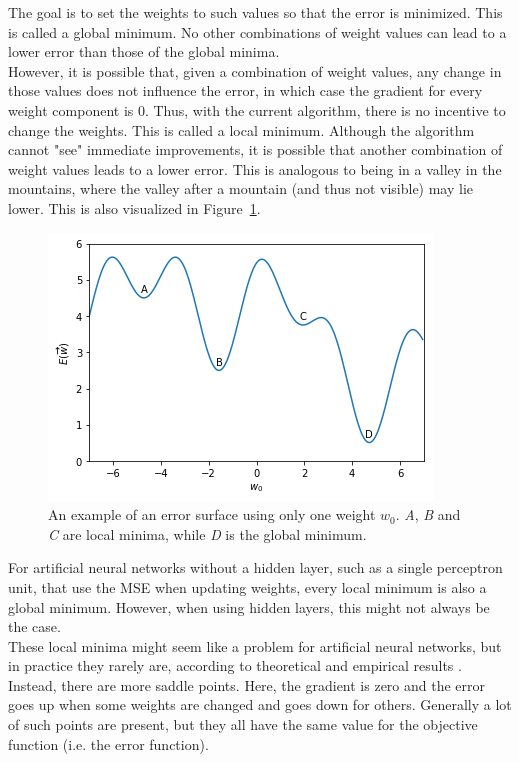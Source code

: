 The goal is to set the weights to such values so that the error is minimized. This is called a global minimum. No other combinations of weight values can lead to a lower error than those of the global minima.\\
However, it is possible that, given a combination of weight values, any change in those values does not influence the error, in which case the gradient for every weight component is $0$. Thus, with the current algorithm, there is no incentive to change the weights. This is called a local minimum. Although the algorithm cannot "see" immediate improvements, it is possible that another combination of weight values leads to a lower error. This is analogous to being in a valley in the mountains, where the valley after a mountain (and thus not visible) may lie lower. This is also visualized in Figure~\ref{fig:error_surface}.\\
\begin{figure}[htb]
    \centering
    \includegraphics[width=.8\linewidth]{images/error_surface.png}
    \caption[An example of an error surface]{An example of an error surface using only one weight $w_0$. \textit{A}, \textit{B} and \textit{C} are local minima, while \textit{D} is the global minimum.}
    \label{fig:error_surface}
\end{figure}

For artificial neural networks without a hidden layer, such as a single perceptron unit, that use the MSE when updating weights, every local minimum is also a global minimum. However, when using hidden layers, this might not always be the case.\\
These local minima might seem like a problem for artificial neural networks, but in practice they rarely are, according to theoretical and empirical results \parencite{choromanska2015loss}.
Instead, there are more saddle points. Here, the gradient is zero and the error goes up when some weights are changed and goes down for others. Generally a lot of such points are present, but they all have the same value for the objective function (i.e. the error function).\\

